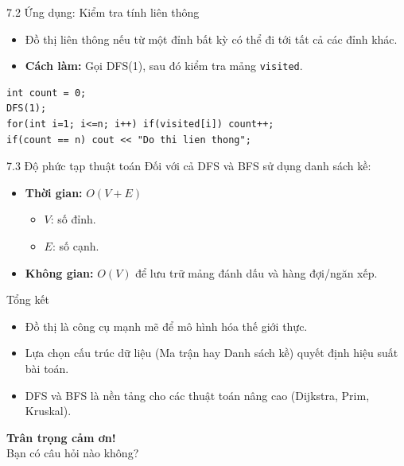 \documentclass[aspectratio=169]{beamer}
\begin{document}
\begin{frame}[fragile]{7.2 Ứng dụng: Kiểm tra tính liên thông}
    \begin{itemize}
        \item Đồ thị liên thông nếu từ một đỉnh bất kỳ có thể đi tới tất cả các đỉnh khác.
        \item \textbf{Cách làm:} Gọi DFS(1), sau đó kiểm tra mảng \texttt{visited}.
    \end{itemize}
\begin{lstlisting}
int count = 0;
DFS(1);
for(int i=1; i<=n; i++) if(visited[i]) count++;
if(count == n) cout << "Do thi lien thong";
\end{lstlisting}
\end{frame}

\begin{frame}{7.3 Độ phức tạp thuật toán}
    Đối với cả DFS và BFS sử dụng danh sách kề:
    \begin{itemize}
        \item \textbf{Thời gian:} $O(V + E)$
        \begin{itemize}
            \item $V$: số đỉnh.
            \item $E$: số cạnh.
        \end{itemize}
        \item \textbf{Không gian:} $O(V)$ để lưu trữ mảng đánh dấu và hàng đợi/ngăn xếp.
    \end{itemize}
\end{frame}

\begin{frame}{Tổng kết}
    \begin{itemize}
        \item Đồ thị là công cụ mạnh mẽ để mô hình hóa thế giới thực.
        \item Lựa chọn cấu trúc dữ liệu (Ma trận hay Danh sách kề) quyết định hiệu suất bài toán.
        \item DFS và BFS là nền tảng cho các thuật toán nâng cao (Dijkstra, Prim, Kruskal).
    \end{itemize}
\end{frame}

\begin{frame}
    \begin{center}
        \textcolor[rgb]{0.50,0.00,0.50}{\Huge \textbf{Trân trọng cảm ơn!}}
        \\ \vspace{1cm}
        \large Bạn có câu hỏi nào không?
    \end{center}
\end{frame}
\end{document}
